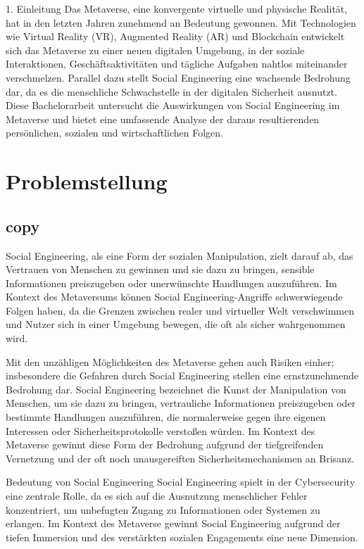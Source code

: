 1. Einleitung
Das Metaverse, eine konvergente virtuelle und physische Realität, hat in den letzten Jahren zunehmend an Bedeutung gewonnen. Mit Technologien wie Virtual Reality (VR), Augmented Reality (AR) und Blockchain entwickelt sich das Metaverse zu einer neuen digitalen Umgebung, in der soziale Interaktionen, Geschäftsaktivitäten und tägliche Aufgaben nahtlos miteinander verschmelzen. Parallel dazu stellt Social Engineering eine wachsende Bedrohung dar, da es die menschliche Schwachstelle in der digitalen Sicherheit ausnutzt. Diese Bachelorarbeit untersucht die Auswirkungen von Social Engineering im Metaverse und bietet eine umfassende Analyse der daraus resultierenden persönlichen, sozialen und wirtschaftlichen Folgen.


\section{Problemstellung}
\subsection*{copy}

Social Engineering, als eine Form der sozialen Manipulation, zielt darauf ab, das Vertrauen von Menschen zu gewinnen und sie dazu zu bringen, sensible Informationen preiszugeben oder unerwünschte Handlungen auszuführen. Im Kontext des Metaversums können Social Engineering-Angriffe schwerwiegende Folgen haben, da die Grenzen zwischen realer und virtueller Welt verschwimmen und Nutzer sich in einer Umgebung bewegen, die oft als sicher wahrgenommen wird.


Mit den unzähligen Möglichkeiten des Metaverse gehen auch Risiken einher; insbesondere die Gefahren durch Social Engineering stellen eine ernstzunehmende Bedrohung dar.
Social Engineering bezeichnet die Kunst der Manipulation von Menschen, um sie dazu zu bringen, vertrauliche Informationen preiszugeben oder bestimmte Handlungen auszuführen, die normalerweise gegen ihre eigenen Interessen oder Sicherheitsprotokolle verstoßen würden. Im Kontext des Metaverse gewinnt diese Form der Bedrohung aufgrund der tiefgreifenden Vernetzung und der oft noch unausgereiften Sicherheitsmechanismen an Brisanz.


Bedeutung von Social Engineering
Social Engineering spielt in der Cybersecurity eine zentrale Rolle, da es sich auf die Ausnutzung menschlicher Fehler konzentriert, um unbefugten Zugang zu Informationen oder Systemen zu erlangen. Im Kontext des Metaverse gewinnt Social Engineering aufgrund der tiefen Immersion und des verstärkten sozialen Engagements eine neue Dimension.

